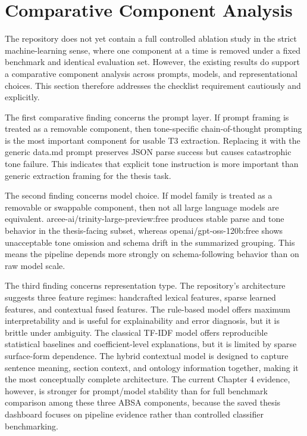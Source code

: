 \documentclass[english, online, cse, master]{dithesis}
\begin{document}
\section{Comparative Component Analysis}

The repository does not yet contain a full controlled ablation study in the strict machine-learning sense, where one component at a time is removed under a fixed benchmark and identical evaluation set. However, the existing results do support a comparative component analysis across prompts, models, and representational choices. This section therefore addresses the checklist requirement cautiously and explicitly.

The first comparative finding concerns the prompt layer. If prompt framing is treated as a removable component, then tone-specific chain-of-thought prompting is the most important component for usable T3 extraction. Replacing it with the generic data.md prompt preserves JSON parse success but causes catastrophic tone failure. This indicates that explicit tone instruction is more important than generic extraction framing for the thesis task.

The second finding concerns model choice. If model family is treated as a removable or swappable component, then not all large language models are equivalent. arcee-ai/trinity-large-preview:free produces stable parse and tone behavior in the thesis-facing subset, whereas openai/gpt-oss-120b:free shows unacceptable tone omission and schema drift in the summarized grouping. This means the pipeline depends more strongly on schema-following behavior than on raw model scale.

The third finding concerns representation type. The repository’s architecture suggests three feature regimes: handcrafted lexical features, sparse learned features, and contextual fused features. The rule-based model offers maximum interpretability and is useful for explainability and error diagnosis, but it is brittle under ambiguity. The classical TF-IDF model offers reproducible statistical baselines and coefficient-level explanations, but it is limited by sparse surface-form dependence. The hybrid contextual model is designed to capture sentence meaning, section context, and ontology information together, making it the most conceptually complete architecture. The current Chapter 4 evidence, however, is stronger for prompt/model stability than for full benchmark comparison among these three ABSA components, because the saved thesis dashboard focuses on pipeline evidence rather than controlled classifier benchmarking.
\end{document}
